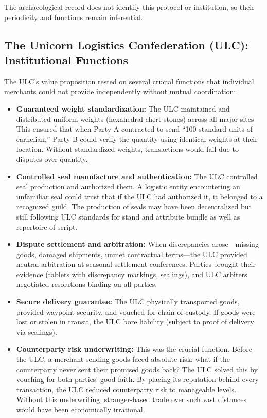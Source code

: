 \documentclass[12pt]{article}
\begin{document}
The archaeological record does not identify this protocol or institution,
so their periodicity and functions remain inferential.


\subsection{The Unicorn Logistics Confederation (ULC): Institutional Functions}

The ULC's value proposition rested on several crucial functions that individual
merchants could not provide independently without mutual coordination:

\begin{itemize}
\item \textbf{Guaranteed weight standardization:} The ULC maintained and distributed uniform
weights (hexahedral chert stones) across all major sites. This ensured that when Party A
contracted to send ``100 standard units of carnelian,'' Party B could verify the quantity
using identical weights at their location. Without standardized weights, transactions
would fail due to disputes over quantity.

\item \textbf{Controlled seal manufacture and authentication:} The ULC controlled seal
production and authorized them. A logistic entity encountering an unfamiliar
seal could trust that if the ULC had authorized it, it belonged to a recognized guild.
The production of seals may have been decentralized but still following ULC standards
for stand and attribute bundle as well as repertoire of script.

\item \textbf{Dispute settlement and arbitration:} When discrepancies arose—missing
goods, damaged shipments, unmet contractual terms—the ULC provided neutral arbitration
at seasonal settlement conferences. Parties brought their evidence (tablets with
discrepancy markings, sealings), and ULC arbiters negotiated resolutions binding on all
parties.

\item \textbf{Secure delivery guarantee:} The ULC physically transported goods, provided
waypoint security, and vouched for chain-of-custody. If goods were lost or stolen in
transit, the ULC bore liability (subject to proof of delivery via sealings).

\item \textbf{Counterparty risk underwriting:} This was the crucial function. Before the
ULC, a merchant sending goods faced absolute risk: what if the counterparty never sent
their promised goods back? The ULC solved this by vouching for both parties' good faith.
By placing its reputation behind every transaction, the ULC reduced counterparty risk to
manageable levels. Without this underwriting, stranger-based trade over such vast
distances would have been economically irrational.


\end{itemize}
\end{document}
